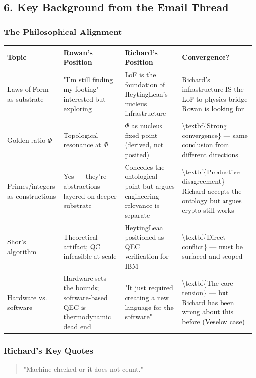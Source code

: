 \documentclass[11pt,a4paper]{article}
\begin{document}
\hrulefill


\subsection{6. Key Background from the Email Thread}


\subsubsection{The Philosophical Alignment}


\begin{tabular}{|l|l|l|l|}
\hline
\textbf{Topic} & \textbf{Rowan's Position} & \textbf{Richard's Position} & \textbf{Convergence?} \\
\hline
Laws of Form as substrate & "I'm still finding my footing"  --- interested but exploring & LoF is the foundation of HeytingLean's nucleus infrastructure & Richard's infrastructure IS the LoF-to-physics bridge Rowan is looking for \\
\hline
Golden ratio $\Phi$ & Topological resonance at $\Phi$ & $\Phi$ as nucleus fixed point (derived, not posited) & \textbackslash{}textbf\{Strong convergence\}  --- same conclusion from different directions \\
\hline
Primes/integers as constructions & Yes  --- they're abstractions layered on deeper substrate & Concedes the ontological point but argues engineering relevance is separate & \textbackslash{}textbf\{Productive disagreement\}  --- Richard accepts the ontology but argues crypto still works \\
\hline
Shor's algorithm & Theoretical artifact; QC infeasible at scale & HeytingLean positioned as QEC verification for IBM & \textbackslash{}textbf\{Direct conflict\}  --- must be surfaced and scoped \\
\hline
Hardware vs. software & Hardware sets the bounds; software-based QEC is thermodynamic dead end & "It just required creating a new language for the software" & \textbackslash{}textbf\{The core tension\}  --- but Richard has been wrong about this before (Veselov case) \\
\hline
\end{tabular}


\subsubsection{Richard's Key Quotes}


\begin{quote}
"Machine-checked or it does not count."
\end{quote}
\end{document}

